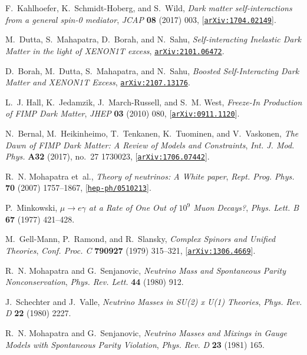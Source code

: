 \documentclass[prd,nofootinbib,preprint,superscriptaddress]{revtex4}
\begin{document}
\begin{thebibliography}{100}
F.~Kahlhoefer, K.~Schmidt-Hoberg, and S.~Wild, {\it {Dark matter
  self-interactions from a general spin-0 mediator}},  {\em JCAP} {\bf 08}
  (2017) 003, [\href{http://arxiv.org/abs/1704.02149}{{\tt arXiv:1704.02149}}].

M.~Dutta, S.~Mahapatra, D.~Borah, and N.~Sahu, {\it {Self-interacting Inelastic
  Dark Matter in the light of XENON1T excess}},
  \href{http://arxiv.org/abs/2101.06472}{{\tt arXiv:2101.06472}}.

D.~Borah, M.~Dutta, S.~Mahapatra, and N.~Sahu, {\it {Boosted Self-Interacting
  Dark Matter and XENON1T Excess}},
  \href{http://arxiv.org/abs/2107.13176}{{\tt arXiv:2107.13176}}.

L.~J. Hall, K.~Jedamzik, J.~March-Russell, and S.~M. West, {\it {Freeze-In
  Production of FIMP Dark Matter}},  {\em JHEP} {\bf 03} (2010) 080,
  [\href{http://arxiv.org/abs/0911.1120}{{\tt arXiv:0911.1120}}].

N.~Bernal, M.~Heikinheimo, T.~Tenkanen, K.~Tuominen, and V.~Vaskonen, {\it {The
  Dawn of FIMP Dark Matter: A Review of Models and Constraints}},  {\em Int. J.
  Mod. Phys.} {\bf A32} (2017), no.~27 1730023,
  [\href{http://arxiv.org/abs/1706.07442}{{\tt arXiv:1706.07442}}].

R.~N. Mohapatra et~al., {\it {Theory of neutrinos: A White paper}},  {\em Rept.
  Prog. Phys.} {\bf 70} (2007) 1757--1867,
  [\href{http://arxiv.org/abs/hep-ph/0510213}{{\tt hep-ph/0510213}}].

P.~Minkowski, {\it {$\mu \to e\gamma$ at a Rate of One Out of $10^{9}$ Muon
  Decays?}},  {\em Phys. Lett. B} {\bf 67} (1977) 421--428.

M.~Gell-Mann, P.~Ramond, and R.~Slansky, {\it {Complex Spinors and Unified
  Theories}},  {\em Conf. Proc. C} {\bf 790927} (1979) 315--321,
  [\href{http://arxiv.org/abs/1306.4669}{{\tt arXiv:1306.4669}}].

R.~N. Mohapatra and G.~Senjanovic, {\it {Neutrino Mass and Spontaneous Parity
  Nonconservation}},  {\em Phys. Rev. Lett.} {\bf 44} (1980) 912.

J.~Schechter and J.~Valle, {\it {Neutrino Masses in SU(2) x U(1) Theories}},
  {\em Phys. Rev. D} {\bf 22} (1980) 2227.

R.~N. Mohapatra and G.~Senjanovic, {\it {Neutrino Masses and Mixings in Gauge
  Models with Spontaneous Parity Violation}},  {\em Phys. Rev. D} {\bf 23}
  (1981) 165.


\end{thebibliography}
\end{document}
